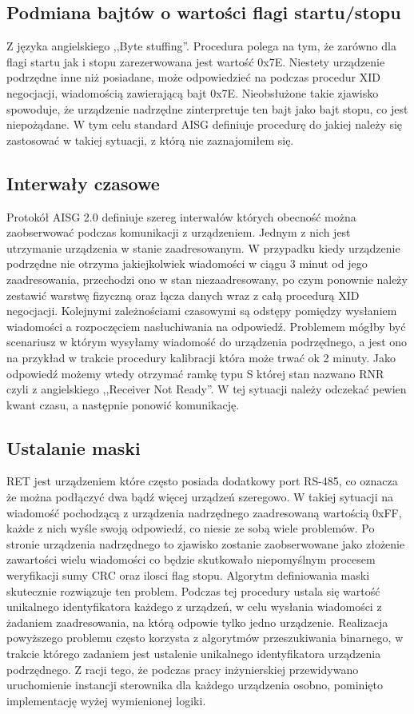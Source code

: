     \subsection{Podmiana bajtów o wartości flagi startu/stopu}
    Z języka angielskiego ,,Byte stuffing''. Procedura polega na tym, że zarówno dla flagi startu jak i stopu zarezerwowana jest wartość 0x7E.
    Niestety urządzenie podrzędne inne niż posiadane, może odpowiedzieć na podczas procedur XID negocjacji, wiadomością zawierającą bajt 0x7E. Nieobsłużone
    takie zjawisko spowoduje, że urządzenie nadrzędne zinterpretuje ten bajt jako bajt stopu, co jest niepożądane\cite{ISO-IEC-13239}. W tym celu standard AISG 
    definiuje procedurę do jakiej należy się zastosować w takiej sytuacji, z którą nie zaznajomiłem się.
    
    \subsection{Interwały czasowe}
    Protokół AISG 2.0 definiuje szereg interwałów których obecność można zaobserwować podczas komunikacji z urządzeniem. Jednym z nich jest
    utrzymanie urządzenia w stanie zaadresowanym. W przypadku kiedy urządzenie podrzędne nie otrzyma jakiejkolwiek wiadomości w ciągu 3 minut
    od jego zaadresowania, przechodzi ono w stan niezaadresowany, po czym ponownie należy zestawić warstwę fizyczną oraz łącza danych wraz
    z całą procedurą XID negocjacji. Kolejnymi zależnościami czasowymi są odstępy pomiędzy wysłaniem wiadomości a rozpoczęciem nasłuchiwania na odpowiedź.
    Problemem mógłby być scenariusz w którym wysyłamy wiadomość do urządzenia podrzędnego, a jest ono na przykład w trakcie procedury kalibracji która może 
    trwać ok 2 minuty. Jako odpowiedź możemy wtedy otrzymać ramkę typu S której stan nazwano RNR czyli z angielskiego ,,Receiver Not Ready''. 
    W tej sytuacji należy odczekać pewien kwant czasu, a następnie ponowić komunikację.

    \subsection{Ustalanie maski}
    RET jest urządzeniem które często posiada dodatkowy port RS-485, co oznacza że można podłączyć dwa bądź więcej urządzeń szeregowo. 
    W takiej sytuacji na wiadomość pochodzącą z urządzenia nadrzędnego zaadresowaną wartością 0xFF, każde z nich wyśle swoją odpowiedź, co niesie ze sobą wiele problemów.
    Po stronie urządzenia nadrzędnego to zjawisko zostanie zaobserwowane jako złożenie zawartości wielu wiadomości co będzie skutkowało niepomyślnym
    procesem weryfikacji sumy CRC oraz ilosci flag stopu. Algorytm definiowania maski skutecznie rozwiązuje ten problem. 
    Podczas tej procedury ustala się wartość unikalnego identyfikatora każdego z urządzeń, w celu wysłania wiadomości z żadaniem zaadresowania,
    na którą odpowie tylko jedno urządzenie. Realizacja powyższego problemu często korzysta z algorytmów przeszukiwania binarnego, w trakcie którego
    zadaniem jest ustalenie unikalnego identyfikatora urządzenia podrzędnego. Z racji tego, że podczas pracy inżynierskiej
    przewidywano uruchomienie instancji sterownika dla każdego urządzenia osobno, pominięto implementację wyżej wymienionej logiki.

